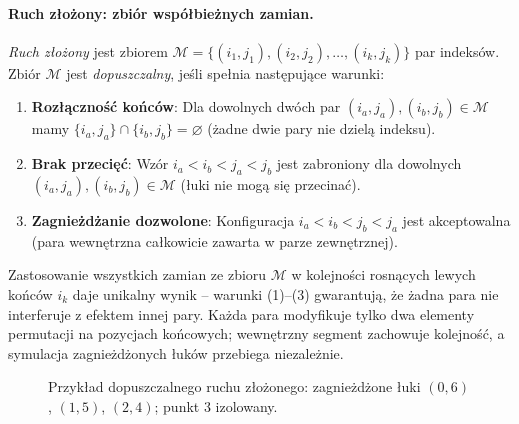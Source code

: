 \paragraph{Ruch złożony: zbiór współbieżnych zamian.}
\emph{Ruch złożony} jest zbiorem $\mathcal{M} = \{(i_1,j_1), (i_2,j_2), \ldots, (i_k,j_k)\}$ par indeksów. Zbiór $\mathcal{M}$ jest \emph{dopuszczalny}, jeśli spełnia następujące warunki:

\begin{enumerate}
  \item \textbf{Rozłączność końców}: Dla dowolnych dwóch par $(i_a,j_a), (i_b,j_b) \in \mathcal{M}$ mamy $\{i_a,j_a\} \cap \{i_b,j_b\} = \varnothing$ (żadne dwie pary nie dzielą indeksu).
  
  \item \textbf{Brak przecięć}: Wzór $i_a < i_b < j_a < j_b$ jest zabroniony dla dowolnych $(i_a,j_a), (i_b,j_b) \in \mathcal{M}$ (łuki nie mogą się przecinać).
  
  \item \textbf{Zagnieżdżanie dozwolone}: Konfiguracja $i_a < i_b < j_b < j_a$ jest akceptowalna (para wewnętrzna całkowicie zawarta w parze zewnętrznej).
\end{enumerate}

Zastosowanie wszystkich zamian ze zbioru $\mathcal{M}$ w kolejności rosnących lewych końców $i_k$ daje unikalny wynik -- warunki (1)–(3) gwarantują, że żadna para nie interferuje z efektem innej pary. Każda para modyfikuje tylko dwa elementy permutacji na pozycjach końcowych; wewnętrzny segment zachowuje kolejność, a symulacja zagnieżdżonych łuków przebiega niezależnie.
\begin{figure}[ht] \label{Przykład_dopuszczalnego_ruchu_złożonego}
  \centering
  \caption{Przykład dopuszczalnego ruchu złożonego: zagnieżdżone łuki $(0,6)$, $(1,5)$, $(2,4)$; punkt 3 izolowany.}
\end{figure}

